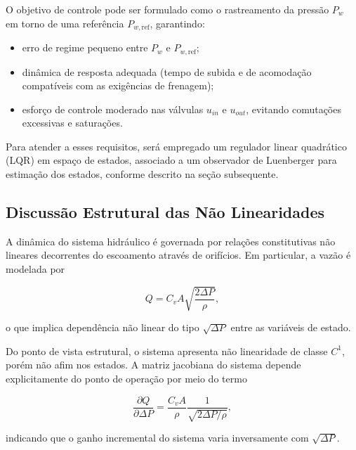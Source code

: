 O objetivo de controle pode ser formulado como o rastreamento da pressão $P_w$ em torno de uma referência $P_{w,\text{ref}}$, garantindo:
\begin{itemize}
    \item erro de regime pequeno entre $P_w$ e $P_{w,\text{ref}}$;
    \item dinâmica de resposta adequada (tempo de subida e de acomodação compatíveis com as exigências de frenagem);
    \item esforço de controle moderado nas válvulas $u_{in}$ e $u_{out}$, evitando comutações excessivas e saturações.
\end{itemize}
Para atender a esses requisitos, será empregado um regulador linear quadrático (LQR) em espaço de estados, associado a um observador de Luenberger para estimação dos estados, conforme descrito na seção subsequente.

\subsection{Discussão Estrutural das Não Linearidades}

A dinâmica do sistema hidráulico é governada por relações constitutivas não lineares decorrentes do escoamento através de orifícios. Em particular, a vazão é modelada por

\begin{equation}
Q = C_v A \sqrt{\frac{2\Delta P}{\rho}},
\end{equation}

o que implica dependência não linear do tipo $\sqrt{\Delta P}$ entre as variáveis de estado.

Do ponto de vista estrutural, o sistema apresenta não linearidade de classe $C^1$, porém não afim nos estados. A matriz jacobiana do sistema depende explicitamente do ponto de operação por meio do termo

\begin{equation}
\frac{\partial Q}{\partial \Delta P} =
\frac{C_v A}{\rho}
\frac{1}{\sqrt{2\Delta P/\rho}},
\end{equation}

indicando que o ganho incremental do sistema varia inversamente com $\sqrt{\Delta P}$.

